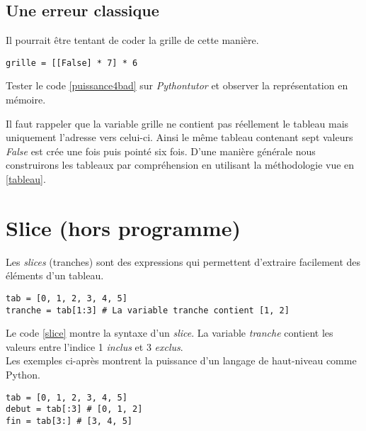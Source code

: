 \documentclass[a4paper,11pt]{article}
\begin{document}
\begin{Form}
\subsection{Une erreur classique}
Il pourrait être tentant de coder la grille de cette manière.
\begin{code}[!h]
\begin{lstlisting}
grille = [[False] * 7] * 6
\end{lstlisting}
\label{puissance4bad}
\end{code}
\begin{activite}
Tester le code \ref{puissance4bad} sur \emph{Pythontutor} et observer la représentation en mémoire.
\end{activite}
Il faut rappeler que la variable grille ne contient pas réellement le tableau mais uniquement l'adresse vers celui-ci. Ainsi le même tableau contenant sept valeurs \emph{False} est crée une fois puis pointé six fois. D'une manière générale nous construirons les tableaux par compréhension en utilisant la méthodologie vue en \ref{tableau}.
\section{Slice (hors programme)}
Les \emph{slices} (tranches) sont des expressions qui permettent d'extraire facilement des éléments d'un tableau.
\begin{code}[!h]
\begin{lstlisting}
tab = [0, 1, 2, 3, 4, 5]
tranche = tab[1:3] # La variable tranche contient [1, 2]
\end{lstlisting}
\label{slice}
\end{code}

Le code \ref{slice} montre la syntaxe d'un \emph{slice}. La variable \emph{tranche} contient les valeurs entre l'indice 1 \emph{inclus} et 3 \emph{exclus}.\\
Les exemples ci-après montrent la puissance d'un langage de haut-niveau comme Python.
\begin{lstlisting}
tab = [0, 1, 2, 3, 4, 5]
debut = tab[:3] # [0, 1, 2]
fin = tab[3:] # [3, 4, 5]
\end{lstlisting}
\end{Form}
\end{document}
